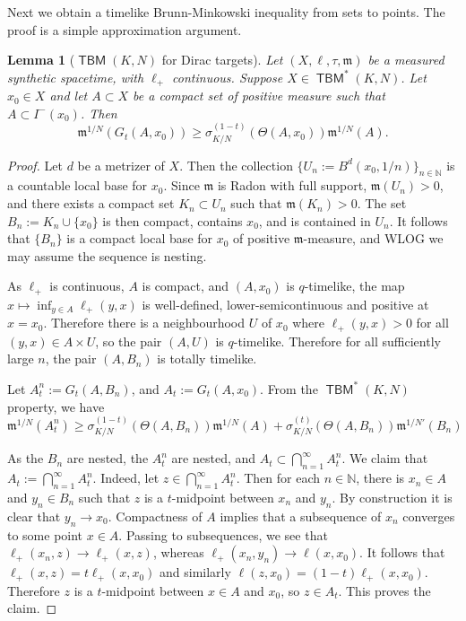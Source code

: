 \documentclass{article}
\newcommand{\N}{\mathbb{N}}
\newcommand{\m}{\mathfrak{m}}
\DeclareMathOperator{\TBM}{\mathsf{TBM}}
\newtheorem{lemma}[theorem]{Lemma}
\theoremstyle{definition}
\begin{document}
{Next we obtain a timelike Brunn-Minkowski inequality from sets to points. The proof is a simple approximation argument. 
\begin{lemma}[$\TBM(K,N)$ for Dirac targets]\label{DiracTBM} Let $(X,\ell,\tau,\m)$ be a measured synthetic spacetime, with $\ell_+$ continuous. Suppose $X\in \TBM^*(K,N)$. Let $x_0\in X$ and let $A\subset X$ be a compact set of positive measure such that $A\subset I^-(x_0)$. Then
\[\m^{1/N}(G_t(A,x_0))\geq \sigma_{K/N}^{(1-t)}(\Theta(A,x_0))\m^{1/N}(A).\]
\end{lemma}
\begin{proof}
Let $d$ be a metrizer of $X$. Then the collection $\{U_n:= B^d(x_0, 1/n)\}_{n\in \N}$ is a countable local base for $x_0$. Since $\m$ is Radon with full support, $\m(U_n)>0$, and there exists a compact set $K_n\subset U_n$ such that $\m(K_n)>0$. The set $B_n:=K_n\cup\{x_0\}$ is then compact, contains $x_0$, and is contained in $U_n$. It follows that $\{B_n\}$ is a compact local base for $x_0$ of positive $\m$-measure, and WLOG we may assume the sequence is nesting. 

As $\ell_+$ is continuous, $A$ is compact, and $(A,x_0)$ is $q$-timelike, the map $x\mapsto \inf_{y\in A}\ell_+(y,x)$ is well-defined, lower-semicontinuous and positive at $x=x_0$. Therefore there is a neighbourhood $U$ of $x_0$ where $\ell_+(y,x)>0$ for all $(y,x)\in A\times U$, so the pair $(A,U)$ is $q$-timelike. Therefore for all sufficiently large $n$, the pair $(A,B_n)$ is totally timelike. 

Let $A_t^n:=G_t(A,B_n)$, and $A_t:=G_t(A,x_0)$. From the $\TBM^*(K,N)$ property, we have 
\[\m^{1/N}(A_t^n)\geq \sigma_{K/N}^{(1-t)}(\Theta(A,B_n))\m^{1/N}(A)+\sigma_{K/N}^{(t)}(\Theta(A,B_n))\m^{1/N'}(B_n) \]

As the $B_n$ are nested, the $A_t^n$ are nested, and $A_t\subset \bigcap_{n=1}^\infty A_t^n$. We claim that $A_t:= \bigcap_{n=1}^\infty A_t^n$. Indeed, let $z\in \bigcap_{n=1}^\infty A_t^n$. Then for each $n\in \N$, there is $x_n\in A$ and $y_n\in B_n$ such that $z$ is a $t$-midpoint between $x_n$ and $y_n$. By construction it is clear that $y_n\to x_0$. Compactness of $A$ implies that a subsequence of $x_n$ converges to some point $x\in A$. Passing to subsequences, we see that $\ell_+(x_n,z)\to \ell_+(x,z)$, whereas $\ell_+(x_n,y_n)\to \ell(x,x_0)$. It follows that $\ell_+(x,z)=t\ell_+(x,x_0)$ and similarly $\ell(z,x_0)=(1-t)\ell_+(x,x_0)$. Therefore $z$ is a $t$-midpoint between $x\in A$ and $x_0$, so $z\in A_t$. This proves the claim. 


\end{proof}}
\end{document}
